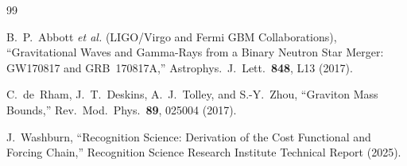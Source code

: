 \documentclass[12pt,a4paper]{article}
\theoremstyle{definition}
\theoremstyle{remark}
\begin{document}
\begin{thebibliography}{99}

B.~P.~Abbott \emph{et al.} (LIGO/Virgo and Fermi GBM
Collaborations), ``Gravitational Waves and Gamma-Rays from a Binary
Neutron Star Merger: GW170817 and GRB~170817A,'' Astrophys.\ J.\
Lett.\ \textbf{848}, L13 (2017).

C.~de~Rham, J.~T.~Deskins, A.~J.~Tolley, and S.-Y.~Zhou,
``Graviton Mass Bounds,'' Rev.\ Mod.\ Phys.\ \textbf{89}, 025004
(2017).

J.~Washburn, ``Recognition Science: Derivation of the Cost
Functional and Forcing Chain,'' Recognition Science Research
Institute Technical Report (2025).

\end{thebibliography}
\end{document}
